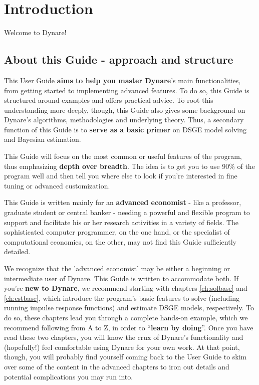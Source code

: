 \documentclass[10pt,math=newtx,citestyle=gb7714-2015,bibstyle=gb7714-2015]{elegantbook}
\begin{document}
	\tableofcontents
	
	\mainmatter
	
	\chapter{Introduction}
	
	Welcome to Dynare! 
	
	\section{About this Guide - approach and structure}
	This User Guide \textbf{aims to help you master Dynare}'s main functionalities, from getting started to implementing advanced features. To do so, this Guide is structured around examples and offers practical advice. To root this understanding more deeply, though, this Guide also gives some background on Dynare's algorithms, methodologies and underlying theory. Thus, a secondary function of this Guide is to \textbf{serve as a basic primer} on DSGE model solving and Bayesian estimation. 
	
	This Guide will focus on the most common or useful features of the program, thus emphasizing \textbf{depth over breadth}. The idea is to get you to use 90\% of the program well and then tell you where else to look if you're interested in fine tuning or advanced customization.
	
	This Guide is written mainly for an \textbf{advanced economist} - like a professor, graduate student or central banker - needing a powerful and flexible program to support and facilitate his or her research activities in a variety of fields. The sophisticated computer programmer, on the one hand, or the specialist of computational economics, on the other, may not find this Guide sufficiently detailed. 
	
	We recognize that the 'advanced economist' may be either a beginning or intermediate user of Dynare. This Guide is written to accommodate both. If you're \textbf{new to Dynare}, we recommend starting with chapters \ref{ch:solbase} and \ref{ch:estbase}, which introduce the program's basic features to solve (including running impulse response functions) and estimate DSGE models, respectively. To do so, these chapters lead you through a complete hands-on example, which we recommend following from A to Z, in order to ``\textbf{learn by doing}''. Once you have read these two chapters, you will know the crux of Dynare's functionality and (hopefully!) feel comfortable using Dynare for your own work. At that point, though, you will probably find yourself coming back to the User Guide to skim over some of the content in the advanced chapters to iron out details and potential complications you may run into.
	
\end{document}
